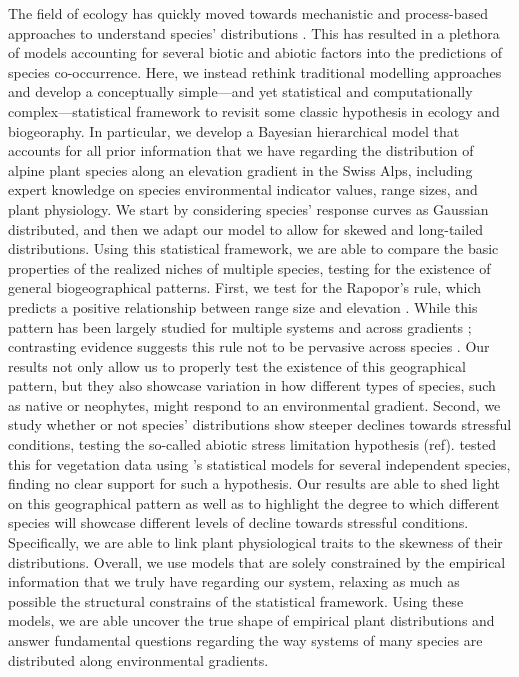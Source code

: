 \documentclass[11pt, a4paper]{article}
\begin{document}

The field of ecology has quickly moved towards mechanistic and process-based approaches to understand species' distributions \citep{wartonManyVariablesJoint2015}. This has resulted in a plethora of models accounting for several biotic and abiotic factors into the predictions of species co-occurrence. Here, we instead rethink traditional modelling approaches and develop a conceptually simple---and yet statistical and computationally complex---statistical framework to revisit some classic hypothesis in ecology and biogeoraphy. In particular, we develop a Bayesian hierarchical model that accounts for all prior information that we have regarding the distribution of alpine plant species along an elevation gradient in the Swiss Alps, including expert knowledge on species environmental indicator values, range sizes, and plant physiology. We start by considering species' response curves as Gaussian distributed, and then we adapt our model to allow for skewed and long-tailed distributions. Using this statistical framework, we are able to compare the basic properties of the realized niches of multiple species, testing for the existence of general biogeographical patterns. First, we test for the Rapopor's rule, which predicts a positive relationship between range size and elevation \citep{stevensElevationalGradientAltitudinal1992}. While this pattern has been largely studied for multiple systems and across gradients \citep{mccainElevationalRapoportRule2013}; contrasting evidence suggests this rule not to be pervasive across species \citep{ribasRapoportEffectWidespread2006, bhattaraiCanRapoportRule2006, mccainElevationalRapoportRule2013}. Our results not only allow us to properly test the existence of this geographical pattern, but they also showcase variation in how different types of species, such as native or neophytes, might respond to an environmental gradient. Second, we study whether or not species' distributions show steeper declines towards stressful conditions, testing the so-called abiotic stress limitation hypothesis (ref). \citet{normandImportanceAbioticStress2009} tested this for vegetation data using \citeauthor{huismanHierarchicalSetModels1993}'s statistical models for several independent species, finding no clear support for such a hypothesis. Our results are able to shed light on this geographical pattern as well as to highlight the degree to which different species will showcase different levels of decline towards stressful conditions. Specifically, we are able to link plant physiological traits to the skewness of their distributions. Overall, we use models that are solely constrained by the empirical information that we truly have regarding our system, relaxing as much as possible the structural constrains of the statistical framework. Using these models, we are able uncover the true shape of empirical plant distributions and answer fundamental questions regarding the way systems of many species are distributed along environmental gradients.
\end{document}
